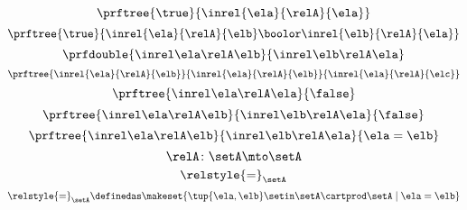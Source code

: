 {\begin{forslides}
        \begin{equation}
            \label{eq:slides_session2_rel_139}
            \prftree{\true}{\inrel{\ela}{\relA}{\ela}}
        \end{equation}
        \begin{equation}
            \label{eq:slides_session2_rel_140}
            \prftree{\true}{\inrel{\ela}{\relA}{\elb} \boolor \inrel{\elb}{\relA}{\ela}}
        \end{equation}
        \begin{equation}
            \label{eq:slides_session2_rel_141}
            \prfdouble{
                \inrel \ela \relA \elb
            }{
                \inrel \elb \relA \ela
            }
        \end{equation}
        \begin{equation}
            \label{eq:slides_session2_rel_142}
            \prftree{\inrel{\ela}{\relA}{\elb}}{\inrel{\ela}{\relA}{\elb}}{\inrel{\ela}{\relA}{\elc}}
        \end{equation}
        \begin{equation}
            \label{eq:slides_session2_rel_143}
            \prftree{
                \inrel \ela \relA \ela
            }{
                \false
            }
        \end{equation}
        \begin{equation}
            \label{eq:slides_session2_rel_144}
            \prftree{
                \inrel \ela \relA \elb
            }{
                \inrel \elb \relA \ela
            }{
                \false
            }
        \end{equation}
        \begin{equation}
            \label{eq:slides_session2_rel_145}
            \prftree{
                \inrel \ela \relA \elb
            }{
                \inrel \elb \relA \ela
            }{
                \ela = \elb
            }
        \end{equation}
        \begin{equation}
            \label{eq:slides_session2_rel_146}
            \relA\colon \setA \mto \setA
        \end{equation}
        \begin{equation}
            \label{eq:slides_session2_rel_147}
            \relstyle{=}_\setA
        \end{equation}
        \begin{equation}
            \label{eq:slides_session2_rel_148}
            \relstyle{=}_\setA \definedas \makeset{\tup{\ela,\elb}\setin \setA\cartprod \setA \mid \ela=\elb}

\end{equation}
\end{forslides}}
